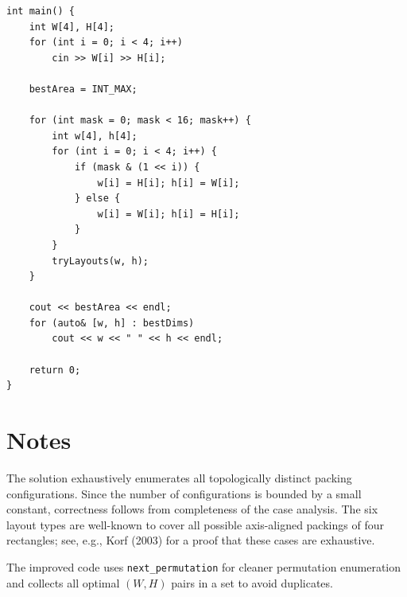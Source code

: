 \documentclass[11pt,a4paper]{article}
\begin{document}
\begin{lstlisting}
int main() {
    int W[4], H[4];
    for (int i = 0; i < 4; i++)
        cin >> W[i] >> H[i];

    bestArea = INT_MAX;

    for (int mask = 0; mask < 16; mask++) {
        int w[4], h[4];
        for (int i = 0; i < 4; i++) {
            if (mask & (1 << i)) {
                w[i] = H[i]; h[i] = W[i];
            } else {
                w[i] = W[i]; h[i] = H[i];
            }
        }
        tryLayouts(w, h);
    }

    cout << bestArea << endl;
    for (auto& [w, h] : bestDims)
        cout << w << " " << h << endl;

    return 0;
}
\end{lstlisting}

\section{Notes}

The solution exhaustively enumerates all topologically distinct packing
configurations. Since the number of configurations is bounded by a small
constant, correctness follows from completeness of the case analysis. The
six layout types are well-known to cover all possible axis-aligned packings
of four rectangles; see, e.g., Korf (2003) for a proof that these cases
are exhaustive.

The improved code uses \texttt{next\_permutation} for cleaner permutation
enumeration and collects all optimal $(W, H)$ pairs in a set to avoid
duplicates.
\end{document}
